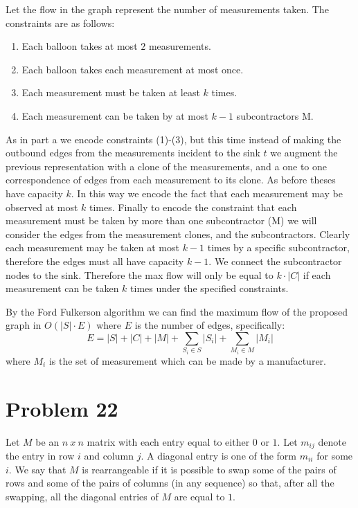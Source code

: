 \documentclass{amsart}
\theoremstyle{definition}
\theoremstyle{remark}
\numberwithin{equation}{section}
\begin{document}
\proof
Let the flow in the graph represent the number of measurements taken. The constraints are as follows: 

\begin{enumerate}
  \item Each balloon takes at most $2$ measurements.
  \item Each balloon takes each measurement at most once.
  \item Each measurement must be taken at least $k$ times.
  \item Each measurement can be taken by at most $k-1$ subcontractors M.
\end{enumerate}

As in part a we encode constraints (1)-(3), but this time instead of making the outbound edges from the measurements incident to the sink $t$ we augment the previous representation with a clone of the measurements, and a one to one correspondence of edges from each measurement to its clone. As before theses have capacity $k$. In this way we encode the fact that each measurement may be observed at most $k$ times. Finally to encode the constraint that each measurement must be taken by more than one subcontractor (M) we will consider the edges from the measurement clones, and the subcontractors. Clearly each measurement may be taken at most $k-1$ times by a specific subcontractor, therefore the edges must all have capacity $k-1$. We connect the subcontractor nodes to the sink. Therefore the max flow will only be equal to $k \cdot |C|$ if each measurement can be taken $k$ times under the specified constraints.

\rmkstar By the Ford Fulkerson algorithm we can find the maximum flow of the proposed graph in $O(|S| \cdot E)$ where $E$ is the number of edges, specifically: 
$$E = |S| + |C| + |M| + \sum_{S_i \in S} |S_i| + \sum_{M_i \in M} |M_i|$$
where $M_i$ is the set of measurement which can be made by a manufacturer.


\section{Problem 22}
Let $M$ be an $n\ x\ n$ matrix with each entry equal to either $0$ or $1$. Let $m_{ij}$ denote the entry in row $i$ and column $j$. A diagonal entry is one of the form $m_{ii}$ for some $i$. We say that $M$ is rearrangeable if it is possible to swap some of the pairs of rows and some of the pairs of columns (in any sequence) so that, after all the swapping, all the diagonal entries of $M$ are equal to $1$.
\end{document}
